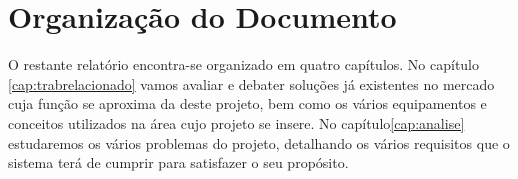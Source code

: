\section{Organização do Documento} \label{sec12}
O restante relatório encontra-se organizado em quatro capítulos. No capítulo \ref{cap:trabrelacionado} vamos avaliar e debater soluções já existentes no mercado cuja função se aproxima da deste projeto, bem como os vários equipamentos e conceitos utilizados na área cujo projeto se insere. No capítulo\ref{cap:analise} estudaremos os vários problemas do projeto, detalhando os vários requisitos que o sistema terá de cumprir para satisfazer o seu propósito. 
